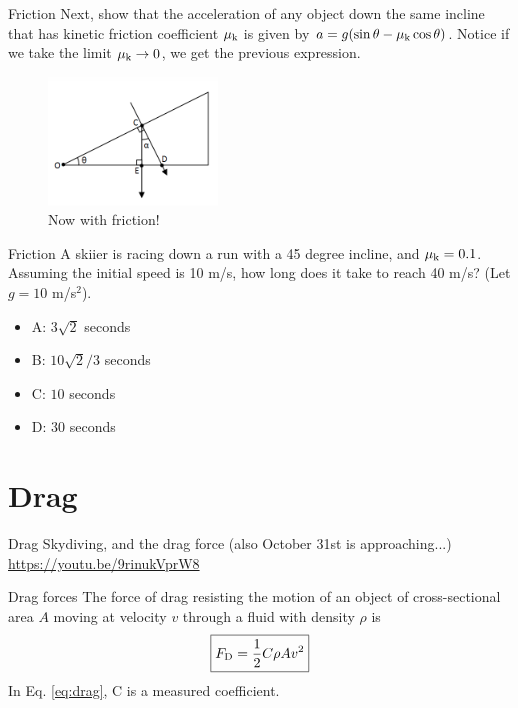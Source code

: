 \documentclass{beamer}
\begin{document}
\begin{frame}{Friction}
Next, show that the acceleration of any object down the same incline \alert{that has kinetic friction coefficient} $\mu_{\rm k} $ is given by $a = g(\sin\theta-\mu_{\rm k}\cos\theta)$.  Notice if we take the limit $\mu_{\rm k} \to 0$, we get the previous expression.
\begin{figure}
\centering
\includegraphics[width=0.4\textwidth]{figures/incline.png}
\caption{\label{fig:incline2} Now with friction!}
\end{figure}
\end{frame}

\begin{frame}{Friction}
A skiier is racing down a run with a 45 degree incline, and $\mu_{\rm k} = 0.1$.  Assuming the initial speed is 10 m/s, how long does it take to reach 40 m/s? (Let $g = 10$ m/s$^2$).
\begin{itemize}
\item A: $3\sqrt{2}$ seconds
\item B: $10\sqrt{2}/3$ seconds
\item C: $10$ seconds
\item D: $30$ seconds
\end{itemize}
\end{frame}

\section{Drag}

\begin{frame}{Drag}
Skydiving, and the drag force (also October 31st is approaching...)
\url{https://youtu.be/9rinukVprW8}
\end{frame}

\begin{frame}{Drag forces}
\alert{The force of drag} resisting the motion of an object of cross-sectional area $A$ moving at velocity $v$ through a fluid with density $\rho$ is \\
\begin{equation}
\boxed{F_{\rm D} = \frac{1}{2}C\rho A v^2}
\label{eq:drag}
\end{equation}
In Eq. \ref{eq:drag}, C is a measured coefficient.
\end{frame}
\end{document}
